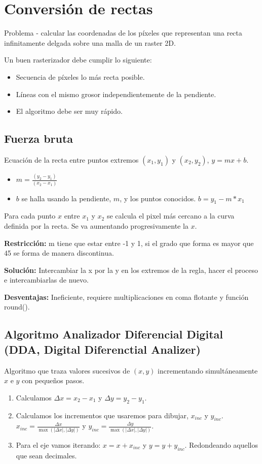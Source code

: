 \section{Conversión de rectas}
Problema - calcular las coordenadas de los píxeles que representan una recta infinitamente delgada sobre una malla de un raster 2D.

Un buen rasterizador debe cumplir lo siguiente:
\begin{itemize}
	\item Secuencia de píxeles lo más recta posible.
	\item Líneas con el mismo grosor independientemente de la pendiente.
	\item El algoritmo debe ser muy rápido.
\end{itemize}

\subsection{Fuerza bruta}
Ecuación de la recta entre puntos extremos $(x_1 ,y_1)$ y $(x_2 ,y_2 )$, $y=mx+b$.
\begin{itemize}
	\item $m= \frac {(y_2-y_1)}{(x_2-x_1)}$
	\item $b$ se halla usando la pendiente, $m$, y los puntos conocidos. $b=y_1-m*x_1$
\end{itemize}
Para cada punto $x$ entre $x_1$ y $x_2$ se calcula el pixel más cercano a la curva definida por la recta. Se va aumentando progresivamente la $x$.

\textbf{Restricción:} m tiene que estar entre -1 y 1, si el grado que forma es mayor que 45 se forma de manera discontinua.

\textbf{Solución:} Intercambiar la x por la y en los extremos de la regla, hacer el proceso e intercambiarlas de nuevo.

\textbf{Desventajas:} Ineficiente, requiere multiplicaciones en coma flotante y función round().

\subsection{Algoritmo Analizador Diferencial Digital (DDA, Digital Diferenctial Analizer)}

Algoritmo que traza valores sucesivos de $(x, y)$ incrementando simultáneamente $x$ e $y$ con pequeños pasos.

\begin{enumerate}
	\item Calculamos $\Delta x = x_2 -x_1$ y $\Delta y = y_2 -y_1$.
	\item Calculamos los incrementos que usaremos para dibujar, $x_{inc}$ y $y_{inc}$. $x_{inc} = \frac{\Delta x}{\max(|\Delta x|, |\Delta y|)}$ y $y_{inc} = \frac{\Delta y}{\max(|\Delta x|, |\Delta y|)}$.
	\item Para el eje vamos iterando: $x=x+x_{inc}$ y $y=y+y_{inc}$. Redondeando aquellos que sean decimales.
\end{enumerate}

